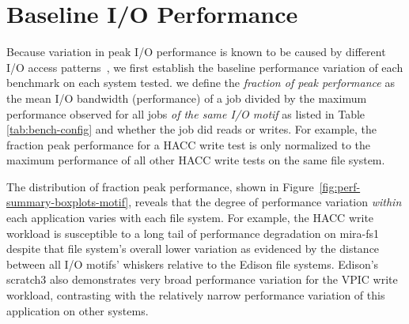 \section{Baseline I/O Performance} \label{sec:results}

Because variation in peak I/O performance is known to be caused by different I/O access patterns~\cite{Lofstead2010,Uselton2010,Xie2012}, we first establish the baseline performance variation of each benchmark on each system tested.
we define the \emph{fraction of peak performance} as the mean I/O bandwidth (performance) of a job divided by the maximum performance observed for all jobs \emph{of the same I/O motif} as listed in Table \ref{tab:bench-config} and whether the job did reads or writes.
For example, the fraction peak performance for a HACC write test is only normalized to the maximum performance of all other HACC write tests on the same file system.

The distribution of fraction peak performance, shown in Figure~\ref{fig:perf-summary-boxplots-motif}, reveals that the degree of performance variation \emph{within} each application varies with each file system.
For example, the HACC write workload is susceptible to a long tail of performance degradation on mira-fs1 despite that file system's overall lower variation as evidenced by the distance between all I/O motifs' whiskers relative to the Edison file systems.
Edison's scratch3 also demonstrates very broad performance variation for the VPIC write workload, contrasting with the relatively narrow performance variation of this application on other systems.

